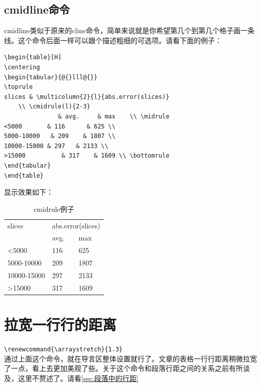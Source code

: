 \documentclass[11pt,oneside]{book}
\begin{document}
\subsection{cmidline命令}
cmidline类似于原来的cline命令，简单来说就是你希望第几个到第几个格子画一条线。这个命令后面一样可以跟个描述粗细的可选项。请看下面的例子：

\begin{Verbatim}
\begin{table}[H]
\centering
\begin{tabular}{@{}lll@{}}
\toprule
slices & \multicolumn{2}{l}{abs.error(slices)} 
    \\ \cmidrule(l){2-3} 
               & avg.     & max    \\ \midrule
<5000       & 116      & 625 \\
5000-10000   & 209    & 1807 \\
10000-15000 & 297   & 2133 \\
>15000          & 317    & 1609 \\ \bottomrule
\end{tabular}
\end{table}
\end{Verbatim}

显示效果如下：
\begin{table}[H]
\centering
\begin{tabular}{@{}lll@{}}
\toprule
slices      & \multicolumn{2}{l}{abs.error(slices)} \\ \cmidrule(l){2-3} 
            & avg.              & max               \\ \midrule
<5000       & 116               & 625               \\
5000-10000  & 209               & 1807              \\
10000-15000 & 297               & 2133              \\
>15000      & 317               & 1609              \\ \bottomrule
\end{tabular}
\caption{cmidrule例子}
\label{tab:cmidrule例子}
\end{table}



\section{拉宽一行行的距离}
\verb+\renewcommand{\arraystretch}{1.3}+\\
通过上面这个命令，就在导言区整体设置就行了。文章的表格一行行距离稍微拉宽了一点，看上去更加美观了些。关于这个命令和段落行距之间的关系之前有所谈及，这里不赘述了。请看\ref{sec:段落中的行距}
\end{document}
